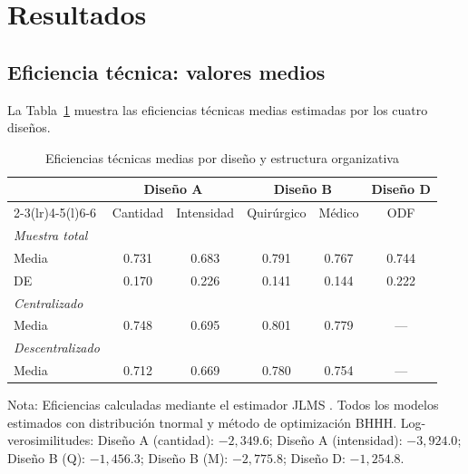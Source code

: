 \documentclass[12pt, a4paper]{article}
\begin{document}
\section{Resultados}

\subsection{Eficiencia técnica: valores medios}

La Tabla~\ref{tab:te_medias} muestra las eficiencias
técnicas medias estimadas por los cuatro diseños.

\begin{table}[h!]
\centering
\caption{Eficiencias técnicas medias por diseño y
estructura organizativa}
\label{tab:te_medias}
\begin{threeparttable}
\begin{tabular}{lccccc}
\toprule
& \multicolumn{2}{c}{\textbf{Diseño A}} &
  \multicolumn{2}{c}{\textbf{Diseño B}} &
  \textbf{Diseño D} \\
\cmidrule(lr){2-3}\cmidrule(lr){4-5}\cmidrule(l){6-6}
& Cantidad & Intensidad & Quirúrgico & Médico & ODF \\
\midrule
\textit{Muestra total} \\
\quad Media & 0.731 & 0.683 & 0.791 & 0.767 & 0.744 \\
\quad DE & 0.170 & 0.226 & 0.141 & 0.144 & 0.222 \\[4pt]
\textit{Centralizado} \\
\quad Media & 0.748 & 0.695 & 0.801 & 0.779 & --- \\[4pt]
\textit{Descentralizado} \\
\quad Media & 0.712 & 0.669 & 0.780 & 0.754 & --- \\
\bottomrule
\end{tabular}
\begin{tablenotes}
  \small
  \item Nota: Eficiencias calculadas mediante el
    estimador JLMS \citep{jondrow1982}. Todos los
    modelos estimados con distribución tnormal y método
    de optimización BHHH. Log-verosimilitudes:
    Diseño A (cantidad): $-2{,}349.6$;
    Diseño A (intensidad): $-3{,}924.0$;
    Diseño B (Q): $-1{,}456.3$;
    Diseño B (M): $-2{,}775.8$;
    Diseño D: $-1{,}254.8$.
\end{tablenotes}
\end{threeparttable}
\end{table}
\end{document}
